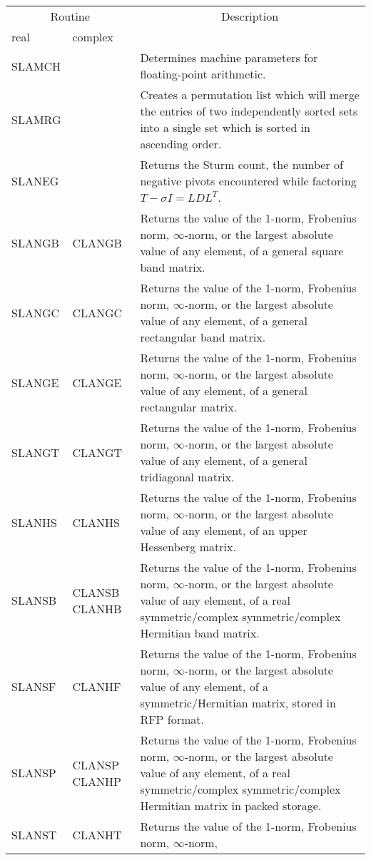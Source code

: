 \begin{center}
\begin{tabular}{| l p{0.75in} |p{4.5in}    |}
\hline \multicolumn{2}{|c|}{Routine}&\multicolumn{1}{c|}{Description} \\ 
\cline{1-2} real&complex&\\
\hline \hline
SLAMCH&& 
Determines machine parameters for floating-point arithmetic.\\
SLAMRG& &
Creates a permutation list which will merge the entries of
two independently sorted sets into a single set which is sorted
in ascending order. \\
SLANEG& &
Returns the Sturm count, the number of negative pivots encountered while
factoring $T - \sigma I = L D L^T$. \\
SLANGB&CLANGB& 
Returns the value of the 1-norm, Frobenius norm, $\infty$-norm,  
or the largest absolute value of any element,
of a general square band matrix.\\
SLANGC&CLANGC&
Returns the value of the 1-norm, Frobenius norm, $\infty$-norm,  
or the largest absolute value of any element,
of a general rectangular band matrix.\\
SLANGE&CLANGE& 
Returns the value of the 1-norm, Frobenius norm, $\infty$-norm,  
or the largest absolute value of any element,
of a general rectangular matrix.\\
SLANGT&CLANGT& 
Returns the value of the 1-norm, Frobenius norm, $\infty$-norm,  
or the largest absolute value of any element, 
of a general tridiagonal matrix.\\
SLANHS&CLANHS&  
Returns the value of the 1-norm, Frobenius norm, $\infty$-norm,  
or the largest absolute value of any element,
of an upper Hessenberg matrix.\\ 
SLANSB&CLANSB CLANHB&
Returns the value of the 1-norm, Frobenius norm, $\infty$-norm,  
or the largest absolute value of any element,
of a real symmetric/complex symmetric/complex Hermitian band matrix.\\
SLANSF & CLANHF &
Returns the value of the 1-norm, Frobenius norm, $\infty$-norm,  
or the largest absolute value of any element,
of a symmetric/Hermitian matrix, stored in RFP format.\\
SLANSP&CLANSP CLANHP&
Returns the value of the 1-norm, Frobenius norm, $\infty$-norm,  
or the largest absolute value of any element,
of a real symmetric/complex symmetric/complex Hermitian matrix
in packed storage.\\
SLANST&CLANHT&  
Returns the value of the 1-norm, Frobenius norm, $\infty$-norm,  

\end{tabular}
\end{center}

